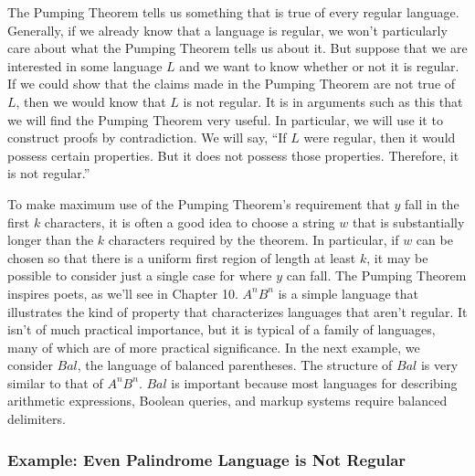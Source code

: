 \documentclass[hidelinks,12pt]{article}
\begin{document}
The Pumping Theorem tells us something that is true of every regular language.
Generally, if we already know that a language is regular, we won’t particularly
care about what the Pumping Theorem tells us about it. But suppose that we are
interested in some language $L$ and we want to know whether or not it is
regular. If we could show that the claims made in the Pumping Theorem are not
true of $L$, then we would know that $L$ is not regular. It is in arguments
such as this that we will find the Pumping Theorem very useful. In particular,
we will use it to construct proofs by contradiction. We will say, “If $L$ were
regular, then it would possess certain properties. But it does not possess
those properties. Therefore, it is not regular.”

To make maximum use of the Pumping Theorem’s requirement that $y$ fall in the
first $k$ characters, it is often a good idea to choose a string $w$ that is
substantially longer than the $k$ characters required by the theorem. In
particular, if $w$ can be chosen so that there is a uniform first region of
length at least $k$, it may be possible to consider just a single case for
where $y$ can fall. The Pumping Theorem inspires poets, as we’ll see in Chapter
10. $A^nB^n$ is a simple language that illustrates the kind of property that
characterizes languages that aren’t regular. It isn’t of much practical
importance, but it is typical of a family of languages, many of which are of
more practical significance. In the next example, we consider $Bal$, the
language of balanced parentheses. The structure of $Bal$ is very similar to
that of $A^nB^n$. $Bal$ is important because most languages for describing
arithmetic expressions, Boolean queries, and markup systems require balanced
delimiters.

\subsubsection{Example: Even Palindrome Language is Not Regular}
\end{document}
